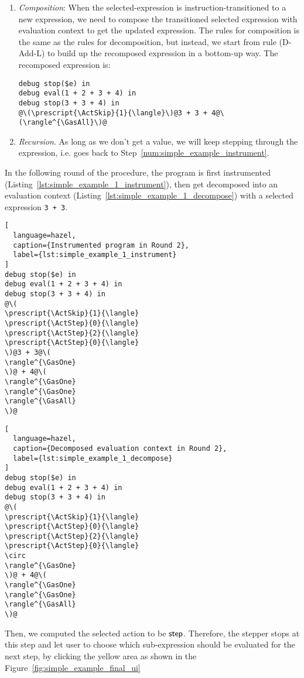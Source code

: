 \begin{enumerate}
\item \emph{Composition}: When the selected-expression is
  instruction-transitioned to a new expression, we need to compose the
  transitioned selected expression with evaluation context to get the
  updated expression. The rules for composition is the same as the
  rules for decomposition, but instead, we start from rule (D-Add-L)
  to build up the recomposed expression in a bottom-up way. The
  recomposed expression is:
  \begin{lstlisting}[language=hazel]
debug stop($e) in
debug eval(1 + 2 + 3 + 4) in
debug stop(3 + 3 + 4) in
@\(\prescript{\ActSkip}{1}{\langle}\)@3 + 3 + 4@\(\rangle^{\GasAll}\)@\end{lstlisting}

\item \emph{Recursion}. As long as we don't get a value, we will keep
  stepping through the expression, i.e. goes back to
  Step~\ref{num:simple_example_instrument}.
\end{enumerate}

In the following round of the procedure, the program is first
instrumented (Listing~\ref{lst:simple_example_1_instrument}), then get
decomposed into an evaluation context
(Listing~\ref{lst:simple_example_1_decompose}) with a selected
expression \lstinline[language=hazel]{3 + 3}.

\begin{lstlisting}[
  language=hazel,
  caption={Instrumented program in Round 2},
  label={lst:simple_example_1_instrument}
]
debug stop($e) in
debug eval(1 + 2 + 3 + 4) in
debug stop(3 + 3 + 4) in
@\(
\prescript{\ActSkip}{1}{\langle}
\prescript{\ActStep}{0}{\langle}
\prescript{\ActStep}{2}{\langle}
\prescript{\ActStep}{0}{\langle}
\)@3 + 3@\(
\rangle^{\GasOne}
\)@ + 4@\(
\rangle^{\GasOne}
\rangle^{\GasOne}
\rangle^{\GasAll}
\)@\end{lstlisting}

\begin{lstlisting}[
  language=hazel,
  caption={Decomposed evaluation context in Round 2},
  label={lst:simple_example_1_decompose}
]
debug stop($e) in
debug eval(1 + 2 + 3 + 4) in
debug stop(3 + 3 + 4) in
@\(
\prescript{\ActSkip}{1}{\langle}
\prescript{\ActStep}{0}{\langle}
\prescript{\ActStep}{2}{\langle}
\prescript{\ActStep}{0}{\langle}
\circ
\rangle^{\GasOne}
\)@ + 4@\(
\rangle^{\GasOne}
\rangle^{\GasOne}
\rangle^{\GasAll}
\)@\end{lstlisting}

Then, we computed the selected action to be \(\mathsf{step}\). Therefore,
the stepper stops at this step and let user to choose which
sub-expression should be evaluated for the next step, by clicking the
yellow area as shown in the Figure~\ref{fig:simple_example_final_ui}

